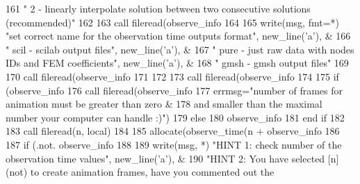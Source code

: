 \begin{DoxyCode}
161 \textcolor{comment}{        }\textcolor{stringliteral}{"       2 - linearly interpolate solution between two consecutive solutions (recommended)"}
162       
163       \textcolor{keyword}{call }fileread(observe_info%
164 \textcolor{comment}{      }
165 \textcolor{comment}{      }\textcolor{keyword}{write}(msg, fmt=*) \textcolor{stringliteral}{"set correct name for the observation time outputs format"}\textcolor{comment}{, new\_line(}\textcolor{stringliteral}{'a'}\textcolor{comment}{), &}
166 \textcolor{comment}{        }\textcolor{stringliteral}{"       scil - scilab output files"},  new\_line(\textcolor{stringliteral}{'a'}), &
167         \textcolor{stringliteral}{"       pure - just raw data with nodes IDs and FEM coefficients"}, new\_line(\textcolor{stringliteral}{'a'}\textcolor{comment}{), &  }
168 \textcolor{comment}{        }\textcolor{stringliteral}{"       gmsh - gmsh output files"}
169       
170       \textcolor{keyword}{call }fileread(observe_info%
171 \textcolor{comment}{      }
172 \textcolor{comment}{      }
173 \textcolor{comment}{      }\textcolor{keyword}{call }fileread(observe_info%
174       
175       \textcolor{keywordflow}{if} (observe_info%
176         \textcolor{keyword}{call }fileread(observe_info%
177 \textcolor{comment}{        errmsg=}\textcolor{stringliteral}{"number of frames for animation must be greater than zero &}
178 \textcolor{stringliteral}{}\textcolor{stringliteral}{        and smaller than the maximal number your computer can handle :)"})
179       \textcolor{keywordflow}{else}
180         observe_info%
181 \textcolor{keywordflow}{      end if}
182       
183       \textcolor{keyword}{call }fileread(n, local)
184 
185       \textcolor{keyword}{allocate}(observe_time(n + observe_info%
186       
187       \textcolor{keywordflow}{if} (.not. observe_info%
188         
189        \textcolor{keyword}{write}(msg, *) \textcolor{stringliteral}{"HINT 1: check number of the observation time values"}\textcolor{comment}{, new\_line(}\textcolor{stringliteral}{'a'}\textcolor{comment}{), &}
190 \textcolor{comment}{        }\textcolor{stringliteral}{"HINT 2: You have selected [n] (not) to create animation frames, have you commented out the
}
\end{DoxyCode}
